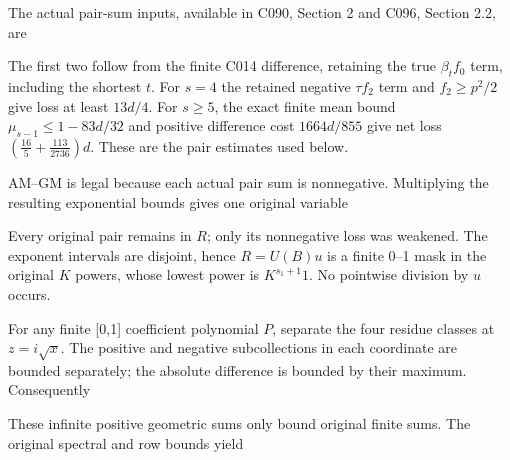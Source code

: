 The actual pair-sum inputs, available in C090, Section 2 and C096, Section 2.2, are


The first two follow from the finite C014 difference, retaining the true \(\beta_t f_{0}\) term, including the shortest \(t\). For \(s=4\) the retained negative \(\tau f_{2}\) term and \(f_{2}\ge p^2/2\) give loss at least \(13d/4\). For \(s\ge 5\), the exact finite mean bound \(\mu_{s-1}\le 1-83d/32\) and positive difference cost \(1664d/855\) give net loss \((\frac{16}{5}+\frac{113}{2736})d\). These are the pair estimates used below.

AM--GM is legal because each actual pair sum is nonnegative. Multiplying the resulting exponential bounds gives one original variable


Every original pair remains in \(R\); only its nonnegative loss was weakened. The exponent intervals are disjoint, hence \(R=U(B)u\) is a finite 0--1 mask in the original \(K\) powers, whose lowest power is \(K^{s_{1}+1}1\). No pointwise division by \(u\) occurs.

For any finite [0,1] coefficient polynomial \(P\), separate the four residue classes at \(z=i \sqrt{x}\). The positive and negative subcollections in each coordinate are bounded separately; the absolute difference is bounded by their maximum. Consequently


These infinite positive geometric sums only bound original finite sums. The original spectral and row bounds yield


